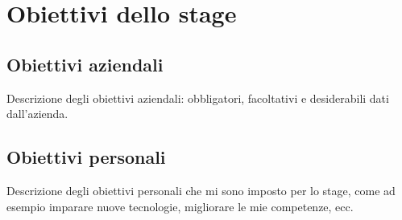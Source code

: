 \section{Obiettivi dello stage}
\label{sez:obiettivi-stage}

\subsection{Obiettivi aziendali}
\label{subsec:obiettivi-aziendali}

Descrizione degli obiettivi aziendali: obbligatori, facoltativi e desiderabili dati dall'azienda.

\subsection{Obiettivi personali}
\label{subsec:obiettivi-personali}

Descrizione degli obiettivi personali che mi sono imposto per lo stage, come ad esempio imparare nuove tecnologie, migliorare le mie competenze, ecc.

